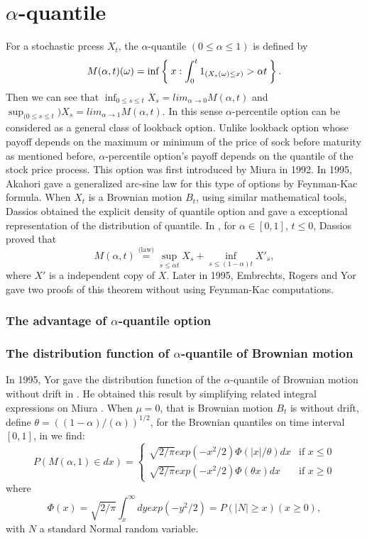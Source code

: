 \documentclass[11pt]{book}
\def\eqlaw{{\stackrel{\text{(law)}}{=}}}
\begin{document}
\chapter{$\alpha$-quantile}
For a stochastic prcess $X_t$,
the $\alpha$-quantile $( 0 \leq \alpha \leq 1)$
is defined by
\[
M(\alpha,t)(\omega) = \inf\Set{x:\int_0^t 1_{(X_s (\omega)\leq x)} > \alpha t}.
\]
Then we can see that $\inf_{0\leq s \leq t}  X_s = lim_{\alpha\to 0}M(\alpha,t)$ and $\sup_{(0\leq s \leq t})  X_s = lim_{\alpha\to 1} M(\alpha, t)$. In this sense $\alpha$-percentile option can be considered as a general class of lookback option. Unlike lookback option whose payoff depends on the maximum or minimum of the price of sock before maturity as mentioned before, $\alpha$-percentile option's payoff depends on the quantile of the stock price process. This option was first introduced by Miura\cite{Miura} in 1992. In 1995, Akahori\cite{Akahori1995} gave a generalized arc-sine law for this type of options by Feynman-Kac formula.
When $X_{t}$ is a Brownian motion $B_t$, using similar mathematical tools, Dassios obtained the explicit density of quantile option and gave a exceptional representation of the distribution of quantile.  In \cite{Dassios1995}, for $\alpha\in[0,1]$, $t\leq 0$, Dassios proved that
\begin{equation}\label{eq:Dassios}
M(\alpha, t) \eqlaw \sup_{s \leq \alpha t} X_s + \inf_{s\leq (1-\alpha)t} X'_s ,
\end{equation}
where $X'$ is a independent copy of $X$. Later in 1995, Embrechts, Rogers and Yor \cite{EmRoge1995} gave two proofs of this theorem without using Feynman-Kac computations.
\subsection{The advantage of $\alpha$-quantile option}
\cite{Ballotta2001}
\subsection{The distribution function of $\alpha$-quantile of Brownian motion}
In 1995, Yor gave the distribution function of the $\alpha$-quantile of Brownian motion without drift in \cite{Yor1995}. He obtained this result by simplifying related integral expressions on Miura \cite{Miura}. When $\mu = 0$, that is Brownian motion $B_t$ is without drift, define $\theta = ((1 - \alpha)/(\alpha))^{1/2}$, for the Brownian quantiles on time interval $[0, 1]$,  in \cite{Yor1995} we find:
\begin{equation}
P(M(\alpha,1)\in dx)= \begin{cases}
\sqrt{2 / \pi}exp(-x^2 / 2) \Phi(|x| / \theta)dx  &  \text{if } x \leq 0 \\
\sqrt{2 / \pi}exp(-x^2 / 2) \Phi(\theta x)dx  &  \text{if } x \geq 0
\end{cases}
\end{equation}
where
\begin{equation}\label{eq:density}
\Phi (x) = \sqrt{2/ \pi} \int^{\infty}_x dy exp(-y^2 / 2) = P (|N| \geq x)     (x \geq 0),
\end{equation}
with $N$ a standard Normal random variable.
\end{document}
